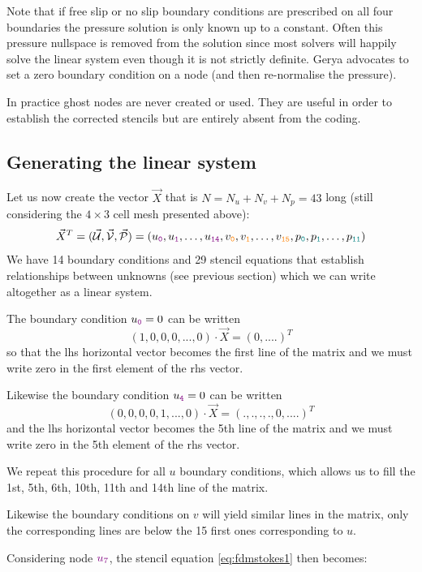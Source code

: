 Note that if free slip or no slip boundary conditions are prescribed on all four boundaries the 
pressure solution is only known up to a constant. Often this pressure nullspace is removed 
from the solution since most solvers will happily solve the linear system even though it is not 
strictly definite. Gerya advocates to set a zero boundary condition on a node (and then re-normalise the 
pressure).

In practice ghost nodes are never created or used. They are useful in order to 
establish the corrected stencils but are entirely absent from the coding.

\subsection{Generating the linear system}

Let us now create the vector $\vec{X}$ that is $N=N_u+N_v+N_p=43$ long 
(still considering 
the $4\times 3$ cell mesh presented above):
\[
\vec{X}^T=(\vec{\cal U}, \vec{\cal V}, \vec{\cal P} )=(
u_{\tt \color{violet} 0},u_{\tt \color{violet} 1}, \dots , u_{\tt \color{violet} 14},
v_{\tt \color{orange} 0},v_{\tt \color{orange} 1}, \dots , v_{\tt \color{orange} 15},
p_{\tt \color{teal} 0},p_{\tt \color{teal} 1}, \dots, p_{\tt \color{teal} 11})
\]
We have 14 boundary conditions and 29 stencil equations that establish relationships between 
unknowns  (see previous section) which we can write altogether as a linear system.

The boundary condition $u_{\color{violet} \tt 0}=0$ can be written 
\[
(1,0,0,0,...,0) \cdot \vec{X} = (0,....)^T
\]
so that the lhs horizontal vector becomes the first line of the matrix and we
must write zero in the first element of the rhs vector. 

Likewise the boundary condition $u_{\color{violet} \tt 4}=0$ can be written
\[
(0,0,0,0,1,...,0) \cdot \vec{X} = (.,.,.,.,0,....)^T
\]
and the lhs horizontal vector becomes the 5th line of the matrix and we
must write zero in the 5th element of the rhs vector. 

We repeat this procedure for all $u$ boundary conditions, which allows us to fill 
the 1st, 5th, 6th, 10th, 11th and 14th line of the matrix.

Likewise the boundary conditions on $v$ will yield similar lines in the matrix, 
only the corresponding lines are below the 15 first ones corresponding to $u$.

Considering node ${\color{violet} u_7}$, the stencil equation \eqref{eq:fdmstokes1} then becomes:



